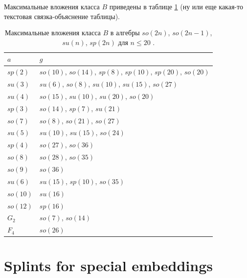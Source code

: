 \documentclass{article}
\begin{document}
Максимальные вложения класса $B$ приведены в таблице \ref{max-embeddings-class-B} (ну или еще какая-то текстовая связка-объяснение таблицы).


\begin{table}[h]

\label{max-embeddings-class-B}
\caption{Максимальные вложения класса $B$ в алгебры $so(2n)$, $so(2n-1)$, $su(n)$, $sp(2n)$ для $n\le 20$ \cite {sp1}.}
\begin{tabular}[t]{|p{3em}|p{20em}|}
\hline
 $a$ & $g$\\
\hline
$ sp(2)$ & $so(10)$, $so(14)$, $sp(8)$, $sp(10)$, $sp(20)$, $so(20)$  \\
\hline
$ su(3)$ & $su(6)$, $so(8)$, $su(10)$, $su(15)$, $so(27)$  \\
\hline
$ su(4)$ & $so(15)$, $su(10)$, $su(20)$, $so(20)$  \\
\hline
$ sp(3)$ & $so(14)$, $sp(7)$, $su(21)$ \\
\hline
$ so(7)$ & $so(8)$, $so(21)$, $so(27)$ \\
\hline
$ su(5)$ & $su(10)$, $su(15)$, $so(24)$ \\
\hline
$ sp(4)$ & $so(27)$, $so(36)$ \\
\hline
$ so(8)$ & $so(28)$, $so(35)$ \\
\hline
$ so(9)$ & $so(36)$ \\
\hline
$ su(6)$ & $su(15)$, $sp(10)$, $so(35)$ \\
\hline
$ so(10)$ & $su(16)$ \\
\hline
$ so(12)$ & $sp(16)$ \\
\hline
$ G_2$ & $so(7)$, $so(14)$ \\
\hline
$ F_4$ & $so(26)$ \\
\hline
\end{tabular}

\end{table}

\section{Splints for special embeddings}
\label{sec:splints-spec-embedd}
\end{document}
